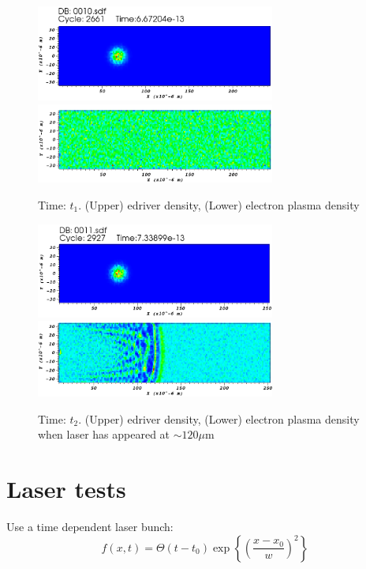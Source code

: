 \documentclass[%
onecolumn, notitlepage,
 amsmath,amssymb,
 aps,
]{article}
\begin{document}
\clearpage

\begin{figure}[!ht]
\centering
\includegraphics[width=0.7\textwidth]{buncht1copy.png}\\
\includegraphics[width=0.7\textwidth]{lasert1copy.png}
\caption{Time: $t_1$. (Upper) edriver density, (Lower) electron plasma density}
\vspace{-10pt}
\end{figure}
\begin{figure}[!ht]
\centering
\includegraphics[width=0.7\textwidth]{buncht2copy.png}\\
\includegraphics[width=0.7\textwidth]{lasert2copy.png}
\caption{Time: $t_2$. (Upper) edriver density, (Lower) electron plasma density when laser has appeared at $\sim 120 \mu$m}
\end{figure}
\clearpage
\section*{Laser tests}
Use a time dependent laser bunch:
\begin{equation}
f(x,t)=\Theta\left(t-t_0\right)\exp\left\{\left(\frac{x-x_0}{w}\right)^2\right\}
\end{equation}
\end{document}
